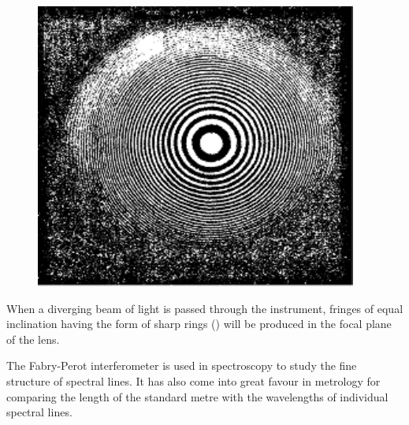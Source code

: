 \begin{figure}[t]
	\begin{center}
		\includegraphics[scale=0.9]{figures/ch_17/fig_17_22.pdf}
		\caption[]{}
		\label{fig:17_22}
	\end{center}
	\vspace{-0.8cm}
\end{figure}

When a diverging beam of light is passed through the instrument, fringes of equal inclination having the form of sharp rings () will be produced in the focal plane of the lens.

The Fabry-Perot interferometer is used in spectroscopy to study the fine structure of spectral lines.
It has also come into great favour in metrology for comparing the length of the standard metre with the wavelengths of individual spectral lines.